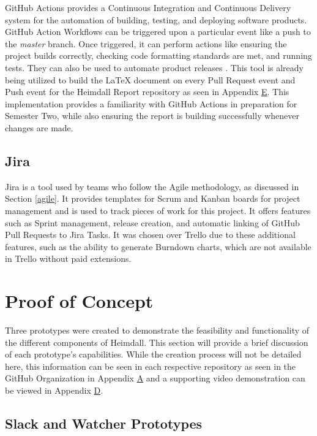 \documentclass{article}
\begin{document}
GitHub Actions provides a Continuous Integration and Continuous Delivery system for the automation of building, testing, and deploying software products. GitHub Action Workflows can be triggered upon a particular event like a push to the \emph{master} branch. Once triggered, it can perform actions like ensuring the project builds correctly, checking code formatting standards are met, and running tests. They can also be used to automate product releases \cite{github-actions}. This tool is already being utilized to build the LaTeX document on every Pull Request event and Push event for the Heimdall Report repository as seen in Appendix \hyperlink{appendix-e}{E}. This implementation provides a familiarity with GitHub Actions in preparation for Semester Two, while also ensuring the report is building successfully whenever changes are made.


\subsection{Jira}

Jira is a tool used by teams who follow the Agile methodology, as discussed in Section \ref{agile}. It provides templates for Scrum and Kanban boards for project management and is used to track pieces of work for this project. It offers features such as Sprint management, release creation, and automatic linking of GitHub Pull Requests to Jira Tasks. It was chosen over Trello due to these additional features, such as the ability to generate Burndown charts, which are not available in Trello without paid extensions.

\section{Proof of Concept}

Three prototypes were created to demonstrate the feasibility and functionality of the different components of Heimdall. This section will provide a brief discussion of each prototype's capabilities. While the creation process will not be detailed here, this information can be seen in each respective repository as seen in the GitHub Organization in Appendix \hyperlink{appendix-a}{A} and a supporting video demonstration can be viewed in Appendix \hyperlink{appendix-d}{D}.

\subsection{Slack and Watcher Prototypes} \label{slack-watch-prototype}
\end{document}
